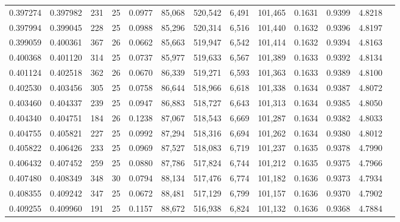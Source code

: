 \begin{tabular}{rrrrrrrrrrrrr}
0.397274 & 0.397982 &   231 &  25 &                                     0.0977 &  85,068 & 520,542 &   6,491 & 101,465 & 0.1631 & 0.9399 & 4.8218 \\
0.397994 & 0.399045 &   228 &  25 &                                     0.0988 &  85,296 & 520,314 &   6,516 & 101,440 & 0.1632 & 0.9396 & 4.8197 \\
0.399059 & 0.400361 &   367 &  26 &                                     0.0662 &  85,663 & 519,947 &   6,542 & 101,414 & 0.1632 & 0.9394 & 4.8163 \\
0.400368 & 0.401120 &   314 &  25 &                                     0.0737 &  85,977 & 519,633 &   6,567 & 101,389 & 0.1633 & 0.9392 & 4.8134 \\
0.401124 & 0.402518 &   362 &  26 &                                     0.0670 &  86,339 & 519,271 &   6,593 & 101,363 & 0.1633 & 0.9389 & 4.8100 \\
0.402530 & 0.403456 &   305 &  25 &                                     0.0758 &  86,644 & 518,966 &   6,618 & 101,338 & 0.1634 & 0.9387 & 4.8072 \\
0.403460 & 0.404337 &   239 &  25 &                                     0.0947 &  86,883 & 518,727 &   6,643 & 101,313 & 0.1634 & 0.9385 & 4.8050 \\
0.404340 & 0.404751 &   184 &  26 &                                     0.1238 &  87,067 & 518,543 &   6,669 & 101,287 & 0.1634 & 0.9382 & 4.8033 \\
0.404755 & 0.405821 &   227 &  25 &                                     0.0992 &  87,294 & 518,316 &   6,694 & 101,262 & 0.1634 & 0.9380 & 4.8012 \\
0.405822 & 0.406426 &   233 &  25 &                                     0.0969 &  87,527 & 518,083 &   6,719 & 101,237 & 0.1635 & 0.9378 & 4.7990 \\
0.406432 & 0.407452 &   259 &  25 &                                     0.0880 &  87,786 & 517,824 &   6,744 & 101,212 & 0.1635 & 0.9375 & 4.7966 \\
0.407480 & 0.408349 &   348 &  30 &                                     0.0794 &  88,134 & 517,476 &   6,774 & 101,182 & 0.1636 & 0.9373 & 4.7934 \\
0.408355 & 0.409242 &   347 &  25 &                                     0.0672 &  88,481 & 517,129 &   6,799 & 101,157 & 0.1636 & 0.9370 & 4.7902 \\
0.409255 & 0.409960 &   191 &  25 &                                     0.1157 &  88,672 & 516,938 &   6,824 & 101,132 & 0.1636 & 0.9368 & 4.7884 \\

\end{tabular}
